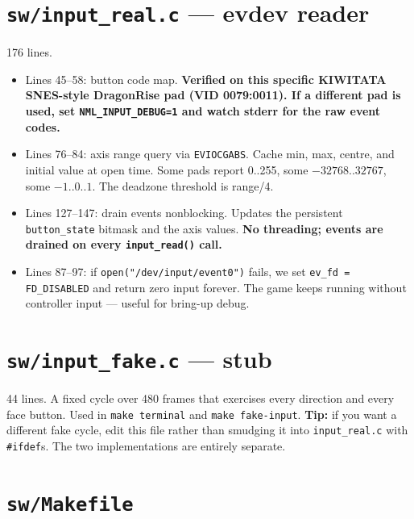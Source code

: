 \documentclass[11pt,letterpaper]{article}
\begin{document}
\section{\texttt{sw/input\_real.c} --- evdev reader}

176 lines.

\begin{itemize}[leftmargin=*]
  \item Lines 45--58: button code map. \textbf{Verified on this specific
    KIWITATA SNES-style DragonRise pad (VID 0079:0011). If a different pad
    is used, set \texttt{NML\_INPUT\_DEBUG=1} and watch stderr for the raw
    event codes.}
  \item Lines 76--84: axis range query via \texttt{EVIOCGABS}. Cache min,
    max, centre, and initial value at open time. Some pads report 0..255,
    some $-32768..32767$, some $-1..0..1$. The deadzone threshold is
    range/4.
  \item Lines 127--147: drain events nonblocking. Updates the persistent
    \texttt{button\_state} bitmask and the axis values. \textbf{No
    threading; events are drained on every \texttt{input\_read()} call.}
  \item Lines 87--97: if \texttt{open("/dev/input/event0")} fails, we set
    \texttt{ev\_fd = FD\_DISABLED} and return zero input forever. The
    game keeps running without controller input --- useful for bring-up
    debug.
\end{itemize}

\section{\texttt{sw/input\_fake.c} --- stub}

44 lines. A fixed cycle over 480 frames that exercises every direction and
every face button. Used in \texttt{make terminal} and \texttt{make
fake-input}. \textbf{Tip:} if you want a different fake cycle, edit this
file rather than smudging it into \texttt{input\_real.c} with
\texttt{\#ifdef}s. The two implementations are entirely separate.

\section{\texttt{sw/Makefile}}
\end{document}
